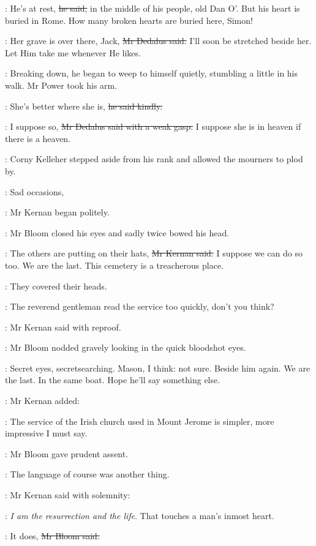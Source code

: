 \power:
He's at rest,
\sout{he said,}
in the middle of his people, old Dan O'.
But his heart is buried in Rome.
How many broken hearts are buried here, Simon!

\simon:
Her grave is over there, Jack,
\sout{Mr Dedalus said.}
I'll soon be stretched beside her.
Let Him take me whenever He likes.

:
Breaking down, he began to weep to himself quietly,
stumbling a little in his walk.
Mr Power took his arm.

\power:
She's better where she is,
\sout{he said kindly.}

\simon:
I suppose so,
\sout{Mr Dedalus said with a weak gasp.}
I suppose she is in heaven if there is a heaven.

:
Corny Kelleher stepped aside from his rank and allowed the mourners to plod by.

:
Sad occasions,

:
Mr Kernan began politely.

:
Mr Bloom closed his eyes and sadly twice bowed his head.

:
The others are putting on their hats,
\sout{Mr Kernan said.}
I suppose we can do so too.
We are the last.
This cemetery is a treacherous place.

:
They covered their heads.

:
The reverend gentleman read the service too quickly, don't you think?

:
Mr Kernan said with reproof.

:
Mr Bloom nodded gravely looking in the quick bloodshot eyes.

\BloomInt:
Secret eyes, secretsearching.
Mason, I think:
not sure.
Beside him again.
We are the last.
In the same boat.
Hope he'll say something else.

:
Mr Kernan added:

:
The service of the Irish church used in Mount Jerome is simpler,
more impressive I must say.

:
Mr Bloom gave prudent assent.

\BloomInt:
The language of course was another thing.

:
Mr Kernan said with solemnity:

:
\emph{I am the resurrection and the life}.
That touches a man's inmost heart.

\Bloom:
It does,
\sout{Mr Bloom said.}

